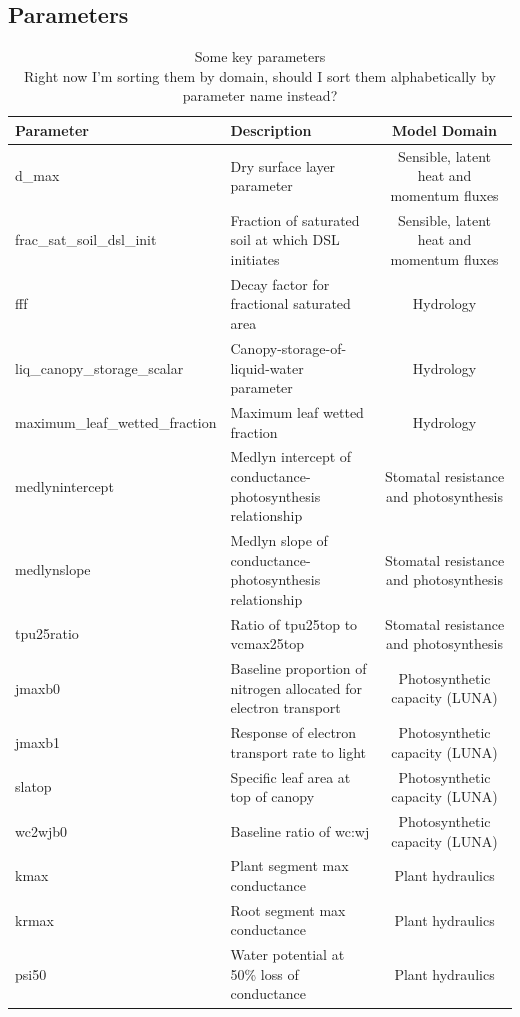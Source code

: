 \documentclass[draft]{agujournal2019}
\begin{document}
\subsection{Parameters} 
\begin{landscape}

 \begin{table}[h]
 \caption{Some key parameters \\
 Right now I'm sorting them by domain, should I sort them alphabetically by parameter name instead?}
 \centering
 \begin{tabular}{l l c}
 \hline
  Parameter  & Description & Model Domain \\
 \hline
d\_max & Dry surface layer parameter & Sensible, latent heat and momentum fluxes \\
frac\_sat\_soil\_dsl\_init & Fraction of saturated soil at which DSL initiates & Sensible, latent heat and momentum fluxes \\
fff & Decay factor for fractional saturated area & Hydrology \\
liq\_canopy\_storage\_scalar & Canopy-storage-of-liquid-water parameter & Hydrology \\
maximum\_leaf\_wetted\_fraction & Maximum leaf wetted fraction & Hydrology \\
medlynintercept & Medlyn intercept of conductance-photosynthesis relationship & Stomatal resistance and photosynthesis \\
medlynslope & Medlyn slope of conductance-photosynthesis relationship & Stomatal resistance and photosynthesis \\
tpu25ratio & Ratio of tpu25top to vcmax25top & Stomatal resistance and photosynthesis \\
jmaxb0 & Baseline proportion of nitrogen allocated for electron transport & Photosynthetic capacity (LUNA) \\
jmaxb1 & Response of electron transport rate to light & Photosynthetic capacity (LUNA) \\
slatop & Specific leaf area at top of canopy & Photosynthetic capacity (LUNA) \\
wc2wjb0 & Baseline ratio of wc:wj & Photosynthetic capacity (LUNA) \\
kmax & Plant segment max conductance & Plant hydraulics \\
krmax & Root segment max conductance & Plant hydraulics \\
psi50 & Water potential at 50\% loss of conductance & Plant hydraulics \\

\end{tabular}
\end{table}
\end{landscape}
\end{document}

